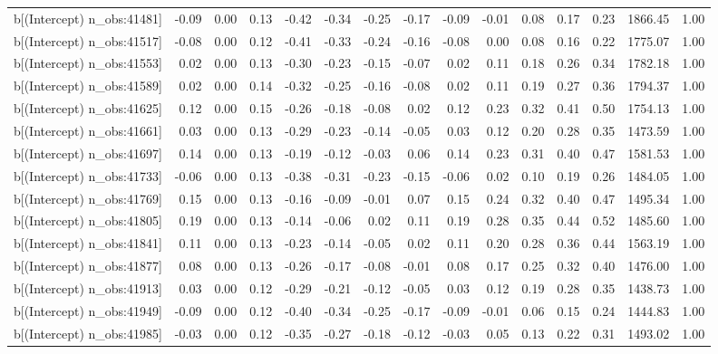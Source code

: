 \begin{table}[ht]
\begin{tabular}{rrrrrrrrrrrrrrr}
  b[(Intercept) n\_obs:41481] & -0.09 & 0.00 & 0.13 & -0.42 & -0.34 & -0.25 & -0.17 & -0.09 & -0.01 & 0.08 & 0.17 & 0.23 & 1866.45 & 1.00 \\ 
  b[(Intercept) n\_obs:41517] & -0.08 & 0.00 & 0.12 & -0.41 & -0.33 & -0.24 & -0.16 & -0.08 & 0.00 & 0.08 & 0.16 & 0.22 & 1775.07 & 1.00 \\ 
  b[(Intercept) n\_obs:41553] & 0.02 & 0.00 & 0.13 & -0.30 & -0.23 & -0.15 & -0.07 & 0.02 & 0.11 & 0.18 & 0.26 & 0.34 & 1782.18 & 1.00 \\ 
  b[(Intercept) n\_obs:41589] & 0.02 & 0.00 & 0.14 & -0.32 & -0.25 & -0.16 & -0.08 & 0.02 & 0.11 & 0.19 & 0.27 & 0.36 & 1794.37 & 1.00 \\ 
  b[(Intercept) n\_obs:41625] & 0.12 & 0.00 & 0.15 & -0.26 & -0.18 & -0.08 & 0.02 & 0.12 & 0.23 & 0.32 & 0.41 & 0.50 & 1754.13 & 1.00 \\ 
  b[(Intercept) n\_obs:41661] & 0.03 & 0.00 & 0.13 & -0.29 & -0.23 & -0.14 & -0.05 & 0.03 & 0.12 & 0.20 & 0.28 & 0.35 & 1473.59 & 1.00 \\ 
  b[(Intercept) n\_obs:41697] & 0.14 & 0.00 & 0.13 & -0.19 & -0.12 & -0.03 & 0.06 & 0.14 & 0.23 & 0.31 & 0.40 & 0.47 & 1581.53 & 1.00 \\ 
  b[(Intercept) n\_obs:41733] & -0.06 & 0.00 & 0.13 & -0.38 & -0.31 & -0.23 & -0.15 & -0.06 & 0.02 & 0.10 & 0.19 & 0.26 & 1484.05 & 1.00 \\ 
  b[(Intercept) n\_obs:41769] & 0.15 & 0.00 & 0.13 & -0.16 & -0.09 & -0.01 & 0.07 & 0.15 & 0.24 & 0.32 & 0.40 & 0.47 & 1495.34 & 1.00 \\ 
  b[(Intercept) n\_obs:41805] & 0.19 & 0.00 & 0.13 & -0.14 & -0.06 & 0.02 & 0.11 & 0.19 & 0.28 & 0.35 & 0.44 & 0.52 & 1485.60 & 1.00 \\ 
  b[(Intercept) n\_obs:41841] & 0.11 & 0.00 & 0.13 & -0.23 & -0.14 & -0.05 & 0.02 & 0.11 & 0.20 & 0.28 & 0.36 & 0.44 & 1563.19 & 1.00 \\ 
  b[(Intercept) n\_obs:41877] & 0.08 & 0.00 & 0.13 & -0.26 & -0.17 & -0.08 & -0.01 & 0.08 & 0.17 & 0.25 & 0.32 & 0.40 & 1476.00 & 1.00 \\ 
  b[(Intercept) n\_obs:41913] & 0.03 & 0.00 & 0.12 & -0.29 & -0.21 & -0.12 & -0.05 & 0.03 & 0.12 & 0.19 & 0.28 & 0.35 & 1438.73 & 1.00 \\ 
  b[(Intercept) n\_obs:41949] & -0.09 & 0.00 & 0.12 & -0.40 & -0.34 & -0.25 & -0.17 & -0.09 & -0.01 & 0.06 & 0.15 & 0.24 & 1444.83 & 1.00 \\ 
  b[(Intercept) n\_obs:41985] & -0.03 & 0.00 & 0.12 & -0.35 & -0.27 & -0.18 & -0.12 & -0.03 & 0.05 & 0.13 & 0.22 & 0.31 & 1493.02 & 1.00 \\ 

\end{tabular}
\end{table}
